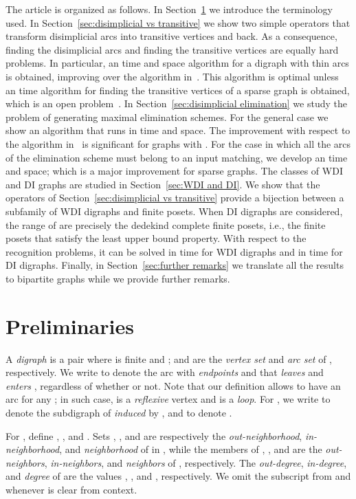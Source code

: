 \documentclass[a4paper,11pt]{article}
\begin{document}
The article is organized as follows. In Section~\ref{sec:preliminaries} we introduce the terminology used.  In Section~\ref{sec:disimplicial vs transitive} we show two simple operators that transform disimplicial arcs into transitive vertices and back.  As a consequence, finding the disimplicial arcs and finding the transitive vertices are equally hard problems.  In particular, an  time and  space algorithm for a digraph with  thin arcs is obtained, improving over the algorithm in~\cite{BomhoffMantheyDAM2013}.  This algorithm is optimal unless an  time algorithm for finding the transitive vertices of a sparse graph is obtained, which is an open problem~\cite{Spinrad2003}.  In Section~\ref{sec:disimplicial elimination} we study the problem of generating maximal elimination schemes.  For the general case we show an algorithm that runs in  time and  space.  The improvement with respect to the algorithm in~\cite{Bomhoff2011} is significant for graphs with .  For the case in which all the arcs of the elimination scheme must belong to an input matching, we develop an  time and  space; which is a major improvement for sparse graphs.  The classes of WDI and DI graphs are studied in Section~\ref{sec:WDI and DI}.  We show that the operators of Section~\ref{sec:disimplicial vs transitive} provide a bijection  between a subfamily of WDI digraphs and finite posets.  When DI digraphs are considered, the range of  are precisely the dedekind complete finite posets, i.e., the finite posets that satisfy the least upper bound property.  With respect to the recognition problems, it can be solved in  time for WDI digraphs and in  time for DI digraphs.  Finally, in Section~\ref{sec:further remarks} we translate all the results to bipartite graphs while we provide further remarks.
  
\section{Preliminaries}\label{sec:preliminaries}

A \emph{digraph} is a pair  where  is finite and ;  and  are the \emph{vertex set} and \emph{arc set} of , respectively.  We write  to denote the arc with \emph{endpoints}  and  that \emph{leaves}  and \emph{enters} , regardless of whether  or not.  Note that our definition allows  to have an arc  for any ; in such case,  is a \emph{reflexive} vertex and  is a \emph{loop}.  For , we write  to denote the subdigraph of  \emph{induced} by , and  to denote . 

For , define , , and .  Sets , , and  are respectively the \emph{out-neighborhood}, \emph{in-neighborhood}, and \emph{neighborhood} of  in , while the members of , , and  are the \emph{out-neighbors}, \emph{in-neighbors}, and \emph{neighbors} of , respectively.  The \emph{out-degree}, \emph{in-degree}, and \emph{degree} of  are the values , , and , respectively.  We omit the subscript from  and  whenever  is clear from context.
\end{document}
